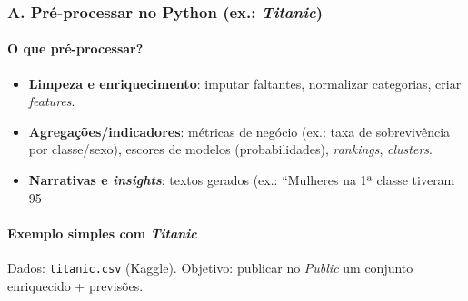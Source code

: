 \subsubsection*{A. Pré-processar no Python (ex.: \textit{Titanic})}
\paragraph{O que pré-processar?}
\begin{itemize}[leftmargin=*]
\item \textbf{Limpeza e enriquecimento}: imputar faltantes, normalizar categorias, criar \emph{features}.
\item \textbf{Agregações/indicadores}: métricas de negócio (ex.: taxa de sobrevivência por classe/sexo), escores de modelos (probabilidades), \emph{rankings}, \emph{clusters}.
\item \textbf{Narrativas e \emph{insights}}: textos gerados (ex.: “Mulheres na 1ª classe tiveram 95%
\end{itemize}

\paragraph{Exemplo simples com \textit{Titanic}}
Dados: \texttt{titanic.csv} (Kaggle). Objetivo: publicar no \textit{Public} um conjunto enriquecido + previsões.


